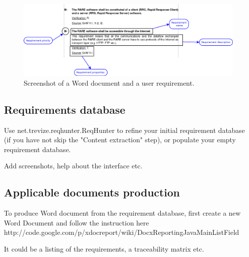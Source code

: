\documentclass{llncs}
\begin{document}
\begin{figure}[H]
	\centering
	\includegraphics[width=\linewidth]{import_req_illu.png}
	\caption{Screenshot of a Word document and a user requirement.}
	\label{fig:import_illu}
\end{figure}

\subsection{Requirements database}

Use net.trevize.reqhunter.ReqHunter to refine your initial requirement database (if you have not skip the "Content extraction" step), or populate your empty requirement database.

Add screenshots, help about the interface etc.

\subsection{Applicable documents production}

To produce Word document from the requirement database, first create a new Word Document and follow the instruction here http://code.google.com/p/xdocreport/wiki/DocxReportingJavaMainListField

It could be a listing of the requirements, a traceability matrix etc.
\end{document}
